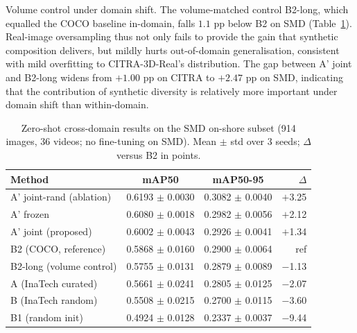 \documentclass[10pt,conference]{IEEEtran}
\begin{document}
Volume control under domain shift. The volume-matched control B2-long, which equalled the COCO baseline in-domain, falls $1.1$ pp below B2 on SMD (Table~\ref{tab:smd_results}). Real-image oversampling thus not only fails to provide the gain that synthetic composition delivers, but mildly hurts out-of-domain generalisation, consistent with mild overfitting to CITRA-3D-Real's distribution. The gap between A' joint and B2-long widens from $+1.00$ pp on CITRA to $+2.47$ pp on SMD, indicating that the contribution of synthetic diversity is relatively more important under domain shift than within-domain.

\begin{table}[t]
\caption{Zero-shot cross-domain results on the SMD on-shore subset (914 images, 36 videos; no fine-tuning on SMD). Mean $\pm$ std over 3 seeds; $\Delta$ versus B2 in points.}
\label{tab:smd_results}
\centering
\begin{tabular}{lccr}
\toprule
Method & mAP50 & mAP50-95 & $\Delta$ \\
\midrule
A' joint-rand (ablation)  & 0.6193 $\pm$ 0.0030 & 0.3082 $\pm$ 0.0040 & $+$3.25 \\
A' frozen                 & 0.6080 $\pm$ 0.0018 & 0.2982 $\pm$ 0.0056 & $+$2.12 \\
A' joint (proposed)       & 0.6002 $\pm$ 0.0043 & 0.2926 $\pm$ 0.0041 & $+$1.34 \\
B2 (COCO, reference)      & 0.5868 $\pm$ 0.0160 & 0.2900 $\pm$ 0.0064 & ref \\
B2-long (volume control)  & 0.5755 $\pm$ 0.0131 & 0.2879 $\pm$ 0.0089 & $-$1.13 \\
A (InaTech curated)       & 0.5661 $\pm$ 0.0241 & 0.2805 $\pm$ 0.0125 & $-$2.07 \\
B (InaTech random)        & 0.5508 $\pm$ 0.0215 & 0.2700 $\pm$ 0.0115 & $-$3.60 \\
B1 (random init)          & 0.4924 $\pm$ 0.0128 & 0.2337 $\pm$ 0.0037 & $-$9.44 \\
\bottomrule
\end{tabular}
\end{table}
\end{document}
